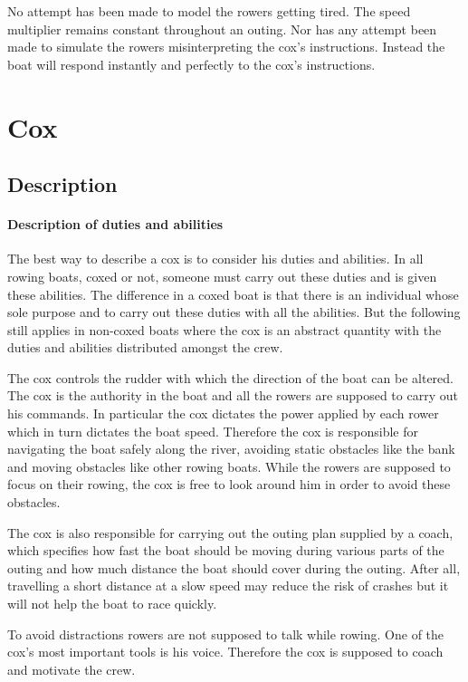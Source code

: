       No attempt has been made to model the rowers getting tired. The speed multiplier remains constant throughout an outing. Nor has any attempt been made to simulate the rowers misinterpreting the cox's instructions. Instead the boat will respond instantly and perfectly to the cox's instructions.
      
    \section{Cox}
      \subsection{Description}
      \paragraph{Description of duties and abilities}
      The best way to describe a cox is to consider his duties and abilities. In all rowing boats, coxed or not, someone must carry out these duties and is given these abilities. The difference in a coxed boat is that there is an individual whose sole purpose and to carry out these duties with all the abilities. But the following still applies in non-coxed boats where the cox is an abstract quantity with the duties and abilities distributed amongst the crew.
      
      The cox controls the rudder with which the direction of the boat can be altered. The cox is the authority in the boat and all the rowers are supposed to carry out his commands. In particular the cox dictates the power applied by each rower which in turn dictates the boat speed. Therefore the cox is responsible for navigating the boat safely along the river, avoiding static obstacles like the bank and moving obstacles like other rowing boats. While the rowers are supposed to focus on their rowing, the cox is free to look around him in order to avoid these obstacles. 
      
      The cox is also responsible for carrying out the outing plan supplied by a coach, which specifies how fast the boat should be moving during various parts of the outing and how much distance the boat should cover during the outing. After all, travelling a short distance at a slow speed may reduce the risk of crashes but it will not help the boat to race quickly.
      
      To avoid distractions rowers are not supposed to talk while rowing. One of the cox's most important tools is his voice. Therefore the cox is supposed to coach and motivate the crew.
      
